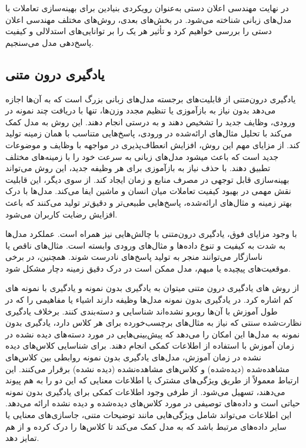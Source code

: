 در نهایت مهندسی اعلان دستی به‌عنوان رویکردی بنیادین برای بهینه‌سازی تعاملات با مدل‌های زبانی شناخته می‌شود. در بخش‌های بعدی، روش‌های مختلف مهندسی اعلان دستی را بررسی خواهیم کرد و تأثیر هر یک را بر توانایی‌های استدلالی و کیفیت پاسخ‌دهی مدل می‌سنجیم.
\subsection{یادگیری درون متنی}

یادگیری درون‌متنی
 از قابلیت‌های برجسته مدل‌های زبانی بزرگ است که به آن‌ها اجازه می‌دهد بدون نیاز به بازآموزی
  یا تنظیم مجدد وزن‌ها، تنها با دریافت چند نمونه در ورودی، وظایف جدید را تشخیص دهند و به درستی انجام دهند. این روش به مدل کمک می‌کند با تحلیل مثال‌های ارائه‌شده در ورودی، پاسخ‌هایی متناسب با همان زمینه تولید کند.
از مزایای مهم این روش، افزایش انعطاف‌پذیری در مواجهه با وظایف و موضوعات جدید است که باعث می\/شود مدل‌های زبانی به سرعت خود را با زمینه‌های مختلف تطبیق دهند. با حذف نیاز به بازآموزی برای هر وظیفه جدید، این روش می‌تواند بهینه‌سازی قابل توجهی در مصرف منابع و زمان ایجاد کند.
از سوی دیگر، این قابلیت نقش مهمی در بهبود کیفیت تعاملات میان انسان و ماشین ایفا می‌کند. مدل‌ها با درک بهتر زمینه و مثال‌های ارائه‌شده، پاسخ‌هایی طبیعی‌تر و دقیق‌تر تولید می‌کنند که باعث افزایش رضایت کاربران می‌شود.

با وجود مزایای فوق، یادگیری درون‌متنی با چالش‌هایی نیز همراه است. عملکرد مدل‌ها به شدت به کیفیت و تنوع داده‌ها و مثال‌های ورودی وابسته است. مثال‌های ناقص یا ناسازگار می‌توانند منجر به تولید پاسخ‌های نادرست شوند. همچنین، در برخی موقعیت‌های پیچیده یا مبهم، مدل ممکن است در درک دقیق زمینه دچار مشکل شود. 


از روش های یادگیری درون متنی میتوان به یادگیری بدون نمونه و یادگیری با نمونه های کم اشاره کرد. در یادگیری بدون نمونه 
\cite{ZSL}
  مدل‌ها وظیفه دارند اشیاء یا مفاهیمی را که در طول آموزش با آن‌ها روبرو نشده‌اند شناسایی و دسته‌بندی کنند. برخلاف یادگیری نظارت‌شده سنتی که نیاز به مثال‌های برچسب‌خورده برای هر کلاس دارد، یادگیری بدون نمونه به مدل‌ها این امکان را می‌دهد که پیش‌بینی‌هایی در مورد دسته‌های دیده نشده در زمان آموزش با استفاده از اطلاعات کمکی انجام دهند.  
برای شناسایی کلاس‌های دیده نشده در زمان آموزش، مدل‌های یادگیری بدون نمونه روابطی بین کلاس‌های مشاهده‌شده (دیده‌شده) و کلاس‌های مشاهده‌نشده (دیده‌ نشده) برقرار می‌کنند. این ارتباط معمولاً از طریق ویژگی‌های مشترک یا اطلاعات معنایی که این دو را به هم پیوند می‌دهند، تسهیل می‌شود.  
از طرفی وجود اطلاعات کمکی برای یادگیری بدون نمونه حیاتی است و  داده‌های توصیفی در مورد کلاس‌های دیده‌شده و دیده نشده ارائه می‌دهد. این اطلاعات می‌تواند شامل ویژگی‌هایی مانند توضیحات متنی، جاسازی‌های معنایی یا سایر داده‌های مرتبط باشد که به مدل کمک می‌کند تا کلاس‌ها را درک کرده و از هم تمایز دهد. 

